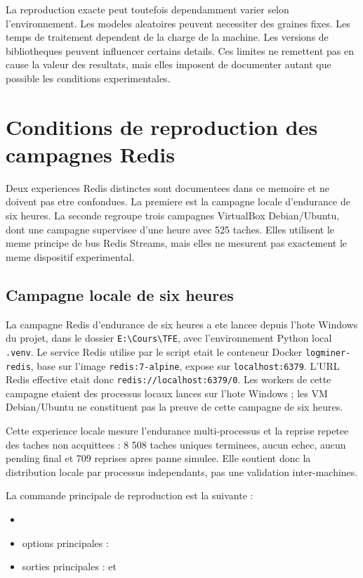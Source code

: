 La reproduction exacte peut toutefois dependamment varier selon l'environnement. Les modeles aleatoires peuvent necessiter des graines fixes. Les temps de traitement dependent de la charge de la machine. Les versions de bibliotheques peuvent influencer certains details. Ces limites ne remettent pas en cause la valeur des resultats, mais elles imposent de documenter autant que possible les conditions experimentales.

\section{Conditions de reproduction des campagnes Redis}
Deux experiences Redis distinctes sont documentees dans ce memoire et ne doivent pas etre confondues. La premiere est la campagne locale d'endurance de six heures. La seconde regroupe trois campagnes VirtualBox Debian/Ubuntu, dont une campagne supervisee d'une heure avec 525 taches. Elles utilisent le meme principe de bus Redis Streams, mais elles ne mesurent pas exactement le meme dispositif experimental.

\subsection{Campagne locale de six heures}
La campagne Redis d'endurance de six heures a ete lancee depuis l'hote Windows du projet, dans le dossier \texttt{E:\textbackslash Cours\textbackslash TFE}, avec l'environnement Python local \texttt{.venv}. Le service Redis utilise par le script etait le conteneur Docker \texttt{logminer-redis}, base sur l'image \texttt{redis:7-alpine}, expose sur \texttt{localhost:6379}. L'URL Redis effective etait donc \texttt{redis://localhost:6379/0}. Les workers de cette campagne etaient des processus locaux lances sur l'hote Windows ; les VM Debian/Ubuntu ne constituent pas la preuve de cette campagne de six heures.

Cette experience locale mesure l'endurance multi-processus et la reprise repetee des taches non acquittees : 8 508 taches uniques terminees, aucun echec, aucun pending final et 709 reprises apres panne simulee. Elle soutient donc la distribution locale par processus independants, pas une validation inter-machines.

La commande principale de reproduction est la suivante :

\begin{itemize}
  \item {}
  \item options principales : 
  \item sorties principales :  et 
\end{itemize}


